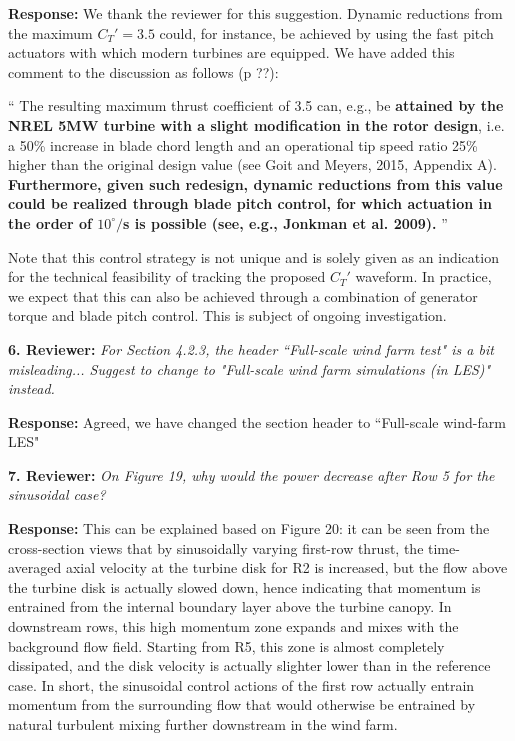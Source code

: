 \documentclass[]{article}
\begin{document}
\textbf{Response: } We thank the reviewer for this suggestion. Dynamic reductions from the maximum $C_T' = 3.5$ could, for instance, be achieved by using the fast pitch actuators with which modern turbines are equipped. We have added this comment to the discussion as follows (p ??):  

``
The resulting maximum thrust coefficient of 3.5 can, e.g., be \textbf{attained by the NREL 5MW turbine with a slight modification in the rotor design}, i.e. a 50\% increase in blade chord length and an operational tip speed ratio 25\% higher than 
the original design value (see Goit and Meyers, 2015, Appendix A). \textbf{Furthermore, given such redesign, dynamic reductions from this value could be realized through blade pitch control, for which actuation in the order of $10^\circ/$s is possible (see, e.g., Jonkman et al. 2009).} 
''
 
Note that this control strategy is not unique and is solely given as an indication for the technical feasibility of tracking the proposed $C_T'$ waveform. In practice, we expect that this can also be achieved through a combination of generator torque and blade pitch control. This is subject of ongoing investigation.  

\dotfill

\textbf{6. Reviewer: } \textit{For Section 4.2.3, the header ``Full-scale wind farm test" is a bit misleading... Suggest
	to change to "Full-scale wind farm simulations (in LES)" instead.}

\textbf{Response: } Agreed, we have changed the section header to ``Full-scale wind-farm LES"

\dotfill

\textbf{7. Reviewer: } \textit{On Figure 19, why would the power decrease after Row 5 for the sinusoidal case?}

\textbf{Response: } This can be explained based on Figure 20: it can be seen from the cross-section views that by sinusoidally varying first-row thrust, the time-averaged axial velocity at the turbine disk for R2 is increased, but the flow above the turbine disk is actually slowed down, hence indicating that momentum is entrained from the internal boundary layer above the turbine canopy. In downstream rows, this high momentum zone expands and mixes with the background flow field. Starting from R5, this zone is almost completely dissipated, and the disk velocity is actually slighter lower than in the reference case. In short, the sinusoidal control actions of the first row actually entrain momentum from the surrounding flow that would otherwise be entrained by natural turbulent mixing further downstream in the wind farm. 
\end{document}
